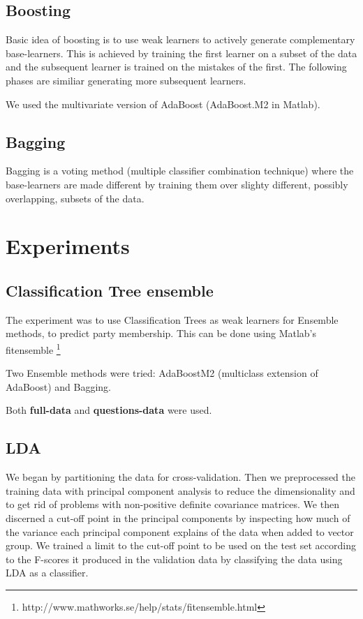 \documentclass[a4paper,10pt]{article}
\begin{document}
\subsection{Boosting}
Basic idea of boosting is to use weak learners to actively generate complementary base-learners. This is achieved by training the first learner on a subset of the data and the subsequent learner is trained on the mistakes of the first. The following phases are similiar generating more subsequent learners.

We used the multivariate version of AdaBoost (AdaBoost.M2 in Matlab). 

\subsection{Bagging}

Bagging is a voting method (multiple classifier combination technique) where the base-learners are made different by training them over slighty different, possibly overlapping, subsets of the data.

\section{Experiments}
\subsection{Classification Tree ensemble}
The experiment was to use Classification Trees as weak learners for Ensemble methods, to predict party membership. This can be done using Matlab’s fitensemble \footnote{http://www.mathworks.se/help/stats/fitensemble.html}

Two Ensemble methods were tried: AdaBoostM2 (multiclass extension of AdaBoost) and Bagging.

Both {\bf full-data} and {\bf questions-data} were used.

\subsection{LDA}
We began by partitioning the data for cross-validation. Then we preprocessed the training data with principal component analysis to reduce the dimensionality and to get rid of problems with non-positive definite covariance matrices. We then discerned a cut-off point in the principal components by inspecting how much of the variance each principal component explains of the data when added to vector group. We trained a limit to the cut-off point to be used on the test set according to the F-scores it produced in the validation data by classifying the data using LDA as a classifier.
\end{document}
